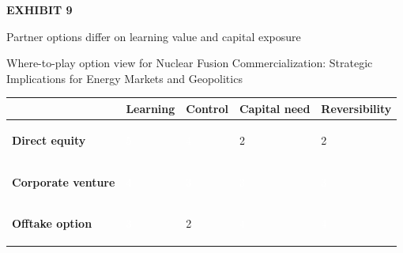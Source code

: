 \documentclass[10pt,a4paper]{article}
\begin{document}
\clearpage
{\textcolor{BOGreen}{\scriptsize\bfseries EXHIBIT 9}}\par\vspace{3pt}
{\sffamily\fontsize{15}{19}\selectfont\color{BONavy} Partner options differ on learning value and capital exposure}\par
{\small\color{BOText} Where-to-play option view for Nuclear Fusion Commercialization: Strategic Implications for Energy Markets and Geopolitics}\par\vspace{4pt}
{\scriptsize\begin{tabular}{p{38mm}>{\centering\arraybackslash}p{21mm}>{\centering\arraybackslash}p{21mm}>{\centering\arraybackslash}p{21mm}>{\centering\arraybackslash}p{21mm}}
 & {\bfseries Learning} & {\bfseries Control} & {\bfseries Capital need} & {\bfseries Reversibility} \\
\hline
{\bfseries Direct equity} & \colorbox{BOGreen}{\textcolor{white}{\strut\hspace{5pt}5\hspace{5pt}}} & \colorbox{BOGreen}{\textcolor{white}{\strut\hspace{5pt}4\hspace{5pt}}} & \colorbox{BOLight}{\textcolor{BOText}{\strut\hspace{5pt}2\hspace{5pt}}} & \colorbox{BOLight}{\textcolor{BOText}{\strut\hspace{5pt}2\hspace{5pt}}} \\
{\bfseries Corporate venture} & \colorbox{BOGreen}{\textcolor{white}{\strut\hspace{5pt}4\hspace{5pt}}} & \colorbox{BOBlue}{\textcolor{white}{\strut\hspace{5pt}3\hspace{5pt}}} & \colorbox{BOBlue}{\textcolor{white}{\strut\hspace{5pt}3\hspace{5pt}}} & \colorbox{BOBlue}{\textcolor{white}{\strut\hspace{5pt}3\hspace{5pt}}} \\
{\bfseries Offtake option} & \colorbox{BOBlue}{\textcolor{white}{\strut\hspace{5pt}3\hspace{5pt}}} & \colorbox{BOLight}{\textcolor{BOText}{\strut\hspace{5pt}2\hspace{5pt}}} & \colorbox{BOGreen}{\textcolor{white}{\strut\hspace{5pt}4\hspace{5pt}}} & \colorbox{BOGreen}{\textcolor{white}{\strut\hspace{5pt}4\hspace{5pt}}} \\

\end{tabular}}
\end{document}
